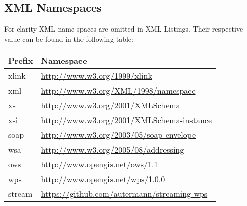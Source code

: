\documentclass[english,
               paper=a4,
               fontsize=11pt,
               bibliography=totoc,
               listof=nochaptergap,
               listof=notoc,
               numbers=noendperiod,
               parskip=half,
               footnotes=multiple,
               toc=numberline,
               captions=tableheading,
               DIV=9,
              ]{scrreprt}
\begin{document}
\begin{appendix}
    \chapter{XML Namespaces}\label{sec:xmlnamespaces}
      For clarity XML name spaces are omitted in XML Listings. Their respective value can be found in the following table:
      \begin{center}
        \begin{small}
          \begin{tabular}{@{}ll@{}}
            \toprule
            \textbf{Prefix} & \textbf{Namespace} \\
            \midrule
            xlink  & \url{http://www.w3.org/1999/xlink}\\
            xml    & \url{http://www.w3.org/XML/1998/namespace}\\
            xs     & \url{http://www.w3.org/2001/XMLSchema}\\
            xsi    & \url{http://www.w3.org/2001/XMLSchema-instance}\\
            soap   & \url{http://www.w3.org/2003/05/soap-envelope}\\
            wsa    & \url{http://www.w3.org/2005/08/addressing}\\
            ows    & \url{http://www.opengis.net/ows/1.1}\\
            wps    & \url{http://www.opengis.net/wps/1.0.0}\\
            stream & \url{https://github.com/autermann/streaming-wps} \\
            \bottomrule
          \end{tabular}
        \end{small}
      \end{center}
  \end{appendix}

\end{document}
